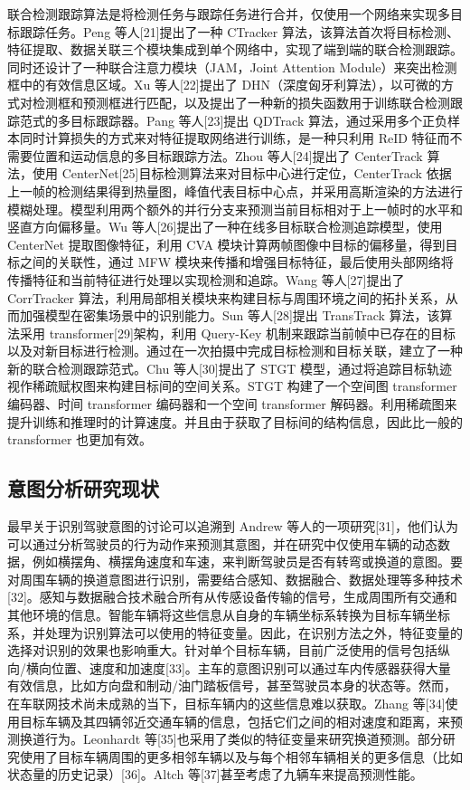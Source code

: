 联合检测跟踪算法是将检测任务与跟踪任务进行合并，仅使用一个网络来实现多目标跟踪任务。Peng 等人[21]提出了一种 CTracker 算法，该算法首次将目标检测、特征提取、数据关联三个模块集成到单个网络中，实现了端到端的联合检测跟踪。同时还设计了一种联合注意力模块（JAM，Joint Attention Module）来突出检测框中的有效信息区域。Xu 等人[22]提出了 DHN（深度匈牙利算法），以可微的方式对检测框和预测框进行匹配，以及提出了一种新的损失函数用于训练联合检测跟踪范式的多目标跟踪器。Pang 等人[23]提出 QDTrack 算法，通过采用多个正负样本同时计算损失的方式来对特征提取网络进行训练，是一种只利用 ReID 特征而不需要位置和运动信息的多目标跟踪方法。Zhou 等人[24]提出了 CenterTrack 算法，使用 CenterNet[25]目标检测算法来对目标中心进行定位，CenterTrack 依据上一帧的检测结果得到热量图，峰值代表目标中心点，并采用高斯渲染的方法进行模糊处理。模型利用两个额外的并行分支来预测当前目标相对于上一帧时的水平和竖直方向偏移量。Wu 等人[26]提出了一种在线多目标联合检测追踪模型，使用 CenterNet 提取图像特征，利用 CVA 模块计算两帧图像中目标的偏移量，得到目标之间的关联性，通过 MFW 模块来传播和增强目标特征，最后使用头部网络将传播特征和当前特征进行处理以实现检测和追踪。Wang 等人[27]提出了 CorrTracker 算法，利用局部相关模块来构建目标与周围环境之间的拓扑关系，从而加强模型在密集场景中的识别能力。Sun 等人[28]提出 TransTrack 算法，该算法采用 transformer[29]架构，利用 Query-Key 机制来跟踪当前帧中已存在的目标以及对新目标进行检测。通过在一次拍摄中完成目标检测和目标关联，建立了一种新的联合检测跟踪范式。Chu 等人[30]提出了 STGT 模型，通过将追踪目标轨迹视作稀疏赋权图来构建目标间的空间关系。STGT 构建了一个空间图 transformer 编码器、时间 transformer 编码器和一个空间 transformer 解码器。利用稀疏图来提升训练和推理时的计算速度。并且由于获取了目标间的结构信息，因此比一般的 transformer 也更加有效。

\subsection{意图分析研究现状}

  最早关于识别驾驶意图的讨论可以追溯到 Andrew 等人的一项研究[31]，他们认为可以通过分析驾驶员的行为动作来预测其意图，并在研究中仅使用车辆的动态数据，例如横摆角、横摆角速度和车速，来判断驾驶员是否有转弯或换道的意图。要对周围车辆的换道意图进行识别，需要结合感知、数据融合、数据处理等多种技术[32]。感知与数据融合技术融合所有从传感设备传输的信号，生成周围所有交通和其他环境的信息。智能车辆将这些信息从自身的车辆坐标系转换为目标车辆坐标系，并处理为识别算法可以使用的特征变量。因此，在识别方法之外，特征变量的选择对识别的效果也影响重大。针对单个目标车辆，目前广泛使用的信号包括纵向/横向位置、速度和加速度[33]。主车的意图识别可以通过车内传感器获得大量有效信息，比如方向盘和制动/油门踏板信号，甚至驾驶员本身的状态等。然而，在车联网技术尚未成熟的当下，目标车辆内的这些信息难以获取。Zhang 等[34]使用目标车辆及其四辆邻近交通车辆的信息，包括它们之间的相对速度和距离，来预测换道行为。Leonhardt 等[35]也采用了类似的特征变量来研究换道预测。部分研究使用了目标车辆周围的更多相邻车辆以及与每个相邻车辆相关的更多信息（比如状态量的历史记录）[36]。Altch 等[37]甚至考虑了九辆车来提高预测性能。

